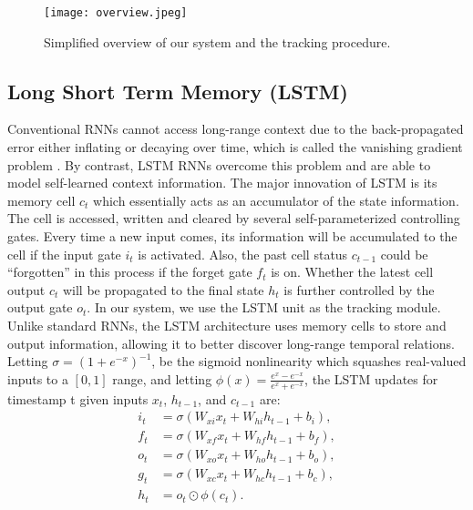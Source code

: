 \documentclass{article}
\begin{document}
\begin{figure}[h] %
      	\centering
      	\captionsetup{justification=centering}
      	\texttt{[image: overview.jpeg]}
      	\caption{Simplified overview of our system and the tracking procedure.}
      	\label{fig-overview}
\end{figure}
        
          
\subsection{Long Short Term Memory (LSTM)}
Conventional RNNs cannot access long-range context due to the back-propagated error either inflating or decaying over time, which is called the vanishing gradient problem \citep{ hochreiter2001gradient}. 
By contrast, LSTM RNNs \citep{ hochreiter1997long} 
overcome this problem and are able to model self-learned context information. 
The major innovation of LSTM is its memory cell $c_{t}$ which essentially acts as an accumulator of the state information. The cell is accessed, written and cleared by several self-parameterized controlling gates. Every time a new input comes, its information will be accumulated to the cell if the input gate $i_{t}$ is activated. Also, the past cell status $c_{t-1}$ could be “forgotten” in this process if the forget gate $f_{t}$ is on. Whether the latest cell output $c_{t}$ will be propagated to the final state $h_{t}$ is further controlled by the output gate $o_{t}$.
In our system, we use the LSTM unit as the tracking module. 
Unlike standard RNNs, the LSTM architecture uses memory cells to store and output information, allowing it to better discover long-range temporal relations. 
Letting $\sigma = (1+ e^{-x})^{-1}$,  be the sigmoid nonlinearity which squashes real-valued inputs to a $[0, 1]$ range, and letting $\phi(x) = \frac{e^{x} - e^{-x}}{e^{x} + e^{-x}}$, the LSTM updates for timestamp t given inputs $x_{t}$,  $h_{t-1}$, and $c_{t-1}$ are:
\begin{equation}
	\begin{aligned}
		i_{t} &= \sigma(W_{xi}x_{t} + W_{hi}h_{t-1} + b_{i}), \\
		f_{t} &= \sigma(W_{xf}x_{t} + W_{hf}h_{t-1} + b_{f}), \\
		o_{t} &= \sigma(W_{xo}x_{t} + W_{ho}h_{t-1} + b_{o}), \\
		g_{t} &= \sigma(W_{xc}x_{t} + W_{hc}h_{t-1} + b_{c}), \\
		h_{t} &= o_{t} \odot \phi(c_{t}).
	\end{aligned}
\end{equation}
\end{document}
